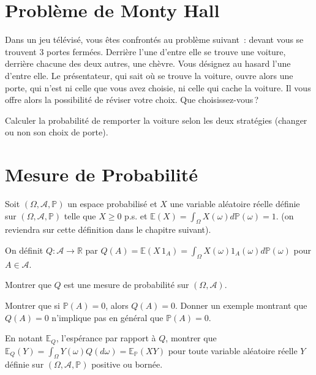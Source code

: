 
\section{Problème de Monty Hall}\label{I-mh}

Dans un jeu télévisé, vous êtes confrontés au problème suivant~: devant
vous se trouvent 3 portes fermées. Derrière l'une d'entre elle se trouve
une voiture, derrière chacune des deux autres, une chèvre. Vous désignez
au hasard l'une d'entre elle. Le présentateur, qui sait où se trouve la
voiture, ouvre alors une porte, qui n'est ni celle que vous avez
choisie, ni celle qui cache la voiture. Il vous offre alors la
possibilité de réviser votre choix. Que choisissez-vous\,?

Calculer la probabilité de remporter la voiture selon les deux
stratégies (changer ou non son choix de porte).

\section{Mesure de Probabilité}\label{I-mesure-de-probabilituxe9}

Soit \((\Omega,\mathcal{A},\mathbb{P})\) un espace probabilisé et \(X\)
une variable aléatoire réelle définie sur
\((\Omega,\mathcal{A},\mathbb{P})\) telle que \(X \geq 0\) p.s. et
\(\mathbb{E}(X) = \int_\Omega X(\omega) d\mathbb{P}(\omega) = 1\). (on
reviendra sur cette définition dans le chapitre suivant).

On définit \(Q : \mathcal{A}\to \mathbb{R}\) par
\(Q(A) = \mathbb{E}(X\,1_A) = \int_{\Omega} X(\omega) 1_A(\omega)d\mathbb{P}(\omega)\)
pour \(A\in \mathcal{A}\).

\label{I-mes-proba1}
Montrer que \(Q\) est une mesure de probabilité sur
\((\Omega,\mathcal{A})\).

\label{I-mes-proba2}
Montrer que si \(\mathbb{P}(A) = 0\), alors \(Q(A) = 0\). Donner un
exemple montrant que \(Q(A) = 0\) n'implique pas en général que
\(\mathbb{P}(A) = 0\).

\label{I-mes-proba3}
En notant \(\mathbb{E}_Q\), l'espérance par rapport à \(Q\), montrer que
\(\mathbb{E}_Q(Y) = \int_{\Omega} Y(\omega) Q(d\omega) = \mathbb{E}_\mathbb{P}(XY)\)
pour toute variable aléatoire réelle \(Y\) définie sur
\((\Omega,\mathcal{A},\mathbb{P})\) positive ou
bornée.

